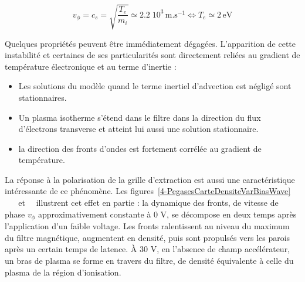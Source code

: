\begin{refsection}
 \begin{equation}
 	v_\phi=c_{s}=\sqrt{\frac{T_e}{m_i}}\simeq 2.2\;10^{3}\,\text{m.s}^{-1}
 	\Leftrightarrow T_e\simeq 2\,\text{eV}
 \end{equation}
 
 Quelques propriétés peuvent être immédiatement dégagées. L'apparition de cette
 instabilité et certaines de ses particularités sont directement reliées au
 gradient de température électronique et au terme d'inertie :
 
 \begin{itemize}
   	\item Les solutions du modèle quand le terme inertiel d'advection est
	négligé sont stationnaires.
   \item Un plasma isotherme s'étend dans le filtre dans la direction du flux
   d'électrons transverse et atteint lui aussi une solution stationnaire.
   \item la direction des fronts d'ondes est fortement corrélée au gradient
   de température.
\end{itemize}

La réponse à la polarisation de la grille d'extraction est aussi une
caractéristique intéressante de ce phénomène. Les
figures~\ref{4-PegasesCarteDensiteVarBiasWave}~
~ ~
et~~ illustrent cet effet en partie : la
dynamique des fronts, de vitesse de phase $v_\phi$ approximativement constante à
0 V, se décompose en deux temps après l'application d'un faible voltage. Les
fronts ralentissent au niveau du maximum du filtre magnétique, augmentent en densité, puis sont
propulsés vers les parois après un certain temps de latence. À 30 V, en
l'absence de champ accélérateur, un bras de plasma se forme en travers du
filtre, de densité équivalente à celle du plasma de la région d'ionisation.
	

\end{refsection}

